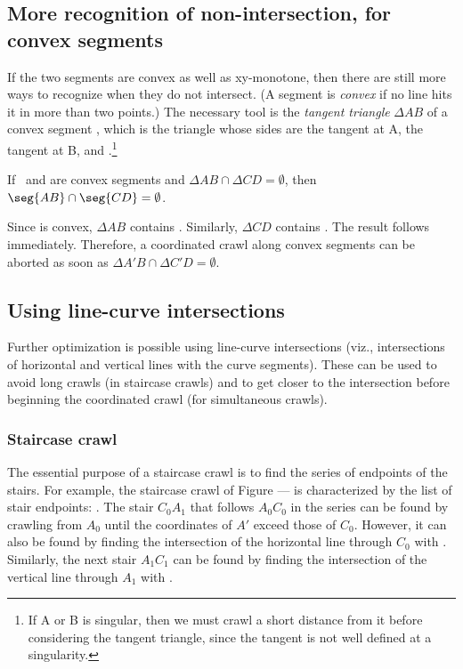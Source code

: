 \subsection{More recognition of non-intersection, for convex segments}
\label{sec-convabort}
%
If the two segments are convex as well as xy-monotone, 
then there are still more ways to recognize when they do not intersect.
(A segment is {\it convex} if no line hits it in more than two points.)
The necessary tool is the {\it tangent triangle} 
$\Delta AB$ of a convex segment
, which is the triangle whose sides are the tangent at A, the tangent
at B, and .\footnote{If A or B is singular, 
	then we must crawl a short distance from it before considering 
	the tangent triangle, since the tangent is not well defined at 
	a singularity.}
%
\begin{lemma}
If \ and  are convex segments and
$\Delta AB \cap \Delta CD = \emptyset$,
then $\seg{AB} \cap \seg{CD} = \emptyset$.
\end{lemma}
Since  is convex, $\Delta AB$ contains .
Similarly, $\Delta CD$ contains .
The result follows immediately.
\QED
%
Therefore, a coordinated crawl along convex segments can be aborted as soon as 
$\Delta A'B \cap \Delta C'D = \emptyset$.
%
%
\subsection{Using line-curve intersections}
\label{sec-linecurve}
%
Further optimization is possible using line-curve intersections (viz., 
intersections of horizontal and vertical lines with the curve segments).
These can be used to avoid long crawls (in staircase crawls)
and to get closer to the intersection before beginning the coordinated crawl
(for simultaneous crawls).
%
\subsubsection{Staircase crawl}
%
%
The essential purpose of a staircase crawl is to find the series of 
endpoints of the stairs.
For example, the staircase crawl of Figure --- is characterized by the list
of stair endpoints:   .
The stair $C_{0}A_{1}$ that follows $A_{0}C_{0}$ in the series can be 
found by crawling from $A_{0}$ until the coordinates of $A'$ exceed those
of $C_{0}$.
However, it can also be found by finding the intersection
of the horizontal line through $C_{0}$ with .
Similarly, the next stair $A_{1}C_{1}$ can be found by finding the 
intersection of the vertical line through $A_{1}$ with .


